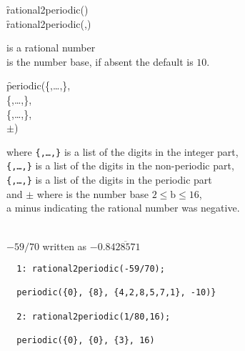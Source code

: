 \begin{description}[labelwidth=!,leftmargin=20mm]
\item[\textbf{SYNTAX:}]
  \begin{syntax}
    \f{rational2periodic()}\\
    \f{rational2periodic(,)}
  \end{syntax}

\item[\textbf{INPUT:}]
   \hspace{3mm} is a rational number\\
   \hspace{3mm} is the number base, if absent the default is $10$.

\item[\textbf{RESULT:}]
  \begin{syntax}
    \f{periodic(}\{,\ldots,\},\\
    \{,\ldots,\},\\
    \{,\ldots,\},\\
    $\pm$)
    \end{syntax}
  where  \texttt{\{,\ldots,\}} is a list of the digits in the integer part,\\
  \texttt{\{,\ldots,\}} is a list of the digits in the non-periodic part,\\
  \texttt{\{,\ldots,\}} is a list of the digits in the periodic part\\
  and $\pm$ where  is the number base $2 \leq \mathrm{b} \leq 16$, \\
  a minus indicating the rational number  was negative.

\item[\textbf{EXAMPLES:}]\mbox{}\\
  $-59/70$ written as $-0.8\overline{428571}$
\begin{verbatim}
  1: rational2periodic(-59/70);

  periodic({0}, {8}, {4,2,8,5,7,1}, -10)}

  2: rational2periodic(1/80,16);

  periodic({0}, {0}, {3}, 16)  
\end{verbatim}
\end{description}

